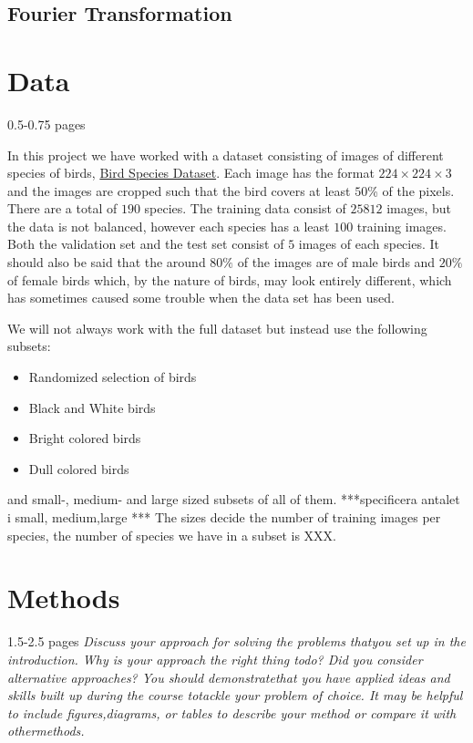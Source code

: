 \documentclass{article}
\begin{document}
\subsection{Fourier Transformation}


\section{Data}

0.5-0.75 pages

In this project we have worked with a dataset consisting of images of different species of birds, 
\href{https://www.kaggle.com/gpiosenka/100-bird-species}{Bird Species Dataset}. Each image has the format $224 \times 224 \times 3$ and the images are cropped such that the bird covers at least $50$\% of the pixels.
There are 
a total of $190$ species. The training data consist of $25812$ images, but the data is not balanced, however each species has a least $100$ training images. 
Both the validation set and the test set consist of $5$ images of each species. 
It should also be said that the around $80\%$ of the images are of male birds and $20\%$ of female 
birds which, by the nature of birds, may look entirely different, which has sometimes caused some trouble when the data set has been used.

We will not always work with the full dataset but instead use the following subsets:

\begin{itemize}
	\item Randomized selection of birds
	\item Black and White birds
	\item Bright colored birds
	\item Dull colored birds 
\end{itemize}

and small-, medium- and large sized subsets of all of them.
***specificera antalet i small, medium,large ***
The sizes decide the number of training images per species, the number of species we have in a subset is XXX.
 

\section{Methods}

1.5-2.5 pages
\textit{Discuss your approach for solving the problems thatyou set up in the introduction. Why is your approach the right thing todo? Did you consider alternative approaches? You should demonstratethat you have applied ideas and skills built up during the course totackle  your  problem  of  choice.   It  may  be  helpful  to  include  figures,diagrams, or tables to describe your method or compare it with othermethods.}
\end{document}
